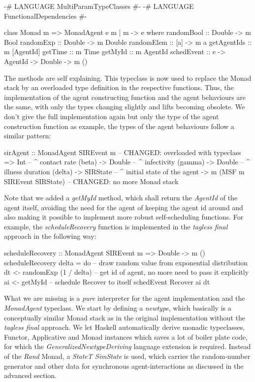 \begin{HaskellCode}
{-# LANGUAGE MultiParamTypeClasses  #-}
{-# LANGUAGE FunctionalDependencies #-}

class Monad m => MonadAgent e m | m -> e where
  randomBool  :: Double -> m Bool
  randomExp   :: Double -> m Double
  randomElem  :: [a] -> m a
  getAgentIds :: m [AgentId]
  getTime     :: m Time
  getMyId     :: m AgentId
  schedEvent  :: e -> AgentId -> Double -> m ()
\end{HaskellCode}

The methods are self explaining. This typeclass is now used to replace the Monad stack by an overloaded type definition in the respective functions. Thus, the implementation of the agent constructing function and the agent behaviours are the same, with only the types changing slightly and lifts becoming obsolete. We don't give the full implementation again but only the type of the agent construction function as example, the types of the agent behaviours follow a similar pattern: 

\begin{HaskellCode}
sirAgent :: MonadAgent SIREvent m  -- CHANGED: overloaded with typeclass
         => Int         -- ^ contact rate (beta)
         -> Double      -- ^ infectivity (gamma)
         -> Double      -- ^ illness duration (delta)
         -> SIRState    -- ^ initial state of the agent
         -> m (MSF m SIREvent SIRState) -- CHANGED: no more Monad stack
\end{HaskellCode}

Note that we added a \textit{getMyId} method, which shall return the \textit{AgentId} of the agent itself, avoiding the need for the agent of keeping the agent id around and also making it possible to implement more robust self-scheduling functions. For example, the \textit{scheduleRecovery} function is implemented in the \textit{tagless final} approach in the following way:

\begin{HaskellCode}
scheduleRecovery :: MonadAgent SIREvent m => Double -> m ()
scheduleRecovery delta = do
  -- draw random value from exponential distribution
  dt <- randomExp (1 / delta)
  -- get id of agent, no more need to pass it explicitly
  ai <- getMyId
  -- schedule Recover to itself
  schedEvent Recover ai dt
\end{HaskellCode}

What we are missing is a \textit{pure} interpreter for the agent implementation and the \textit{MonadAgent} typeclass. We start by defining a \textit{newtype}, which basically is a conceptually similar Monad stack as in the original implementation without the \textit{tagless final} approach. We let Haskell automatically derive monadic typeclasses, Functor, Applicative and Monad instances which saves a lot of boiler plate code, for which the \textit{GeneralizedNewtypeDeriving} language extension is required. Instead of the \textit{Rand} Monad, a \textit{StateT SimState} is used, which carries the random-number generator and other data  for synchronous agent-interactions as discussed in the advanced section. 

